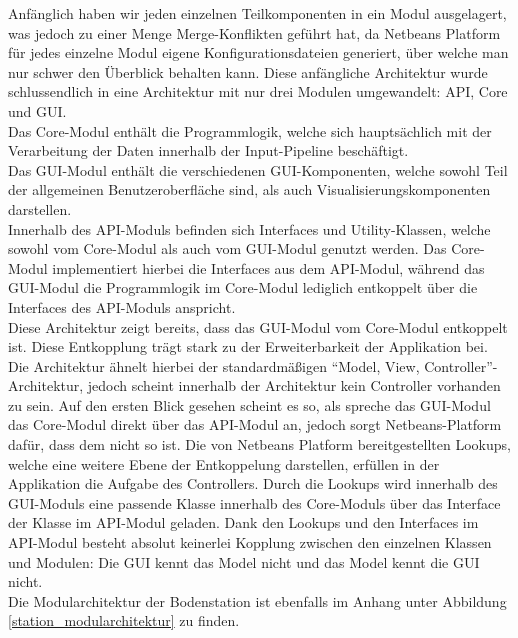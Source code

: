 Anfänglich haben wir jeden einzelnen Teilkomponenten in ein Modul ausgelagert, was jedoch zu einer Menge Merge-Konflikten geführt hat, da Netbeans Platform für jedes einzelne Modul eigene Konfigurationsdateien generiert, über welche man nur schwer den Überblick behalten kann. Diese anfängliche Architektur wurde schlussendlich in eine Architektur mit nur drei Modulen umgewandelt: API, Core und GUI. \\
Das Core-Modul enthält die Programmlogik, welche sich hauptsächlich mit der Verarbeitung der Daten innerhalb der Input-Pipeline beschäftigt. \\
Das GUI-Modul enthält die verschiedenen GUI-Komponenten, welche sowohl Teil der allgemeinen Benutzeroberfläche sind, als auch Visualisierungskomponenten darstellen. \\
Innerhalb des API-Moduls befinden sich Interfaces und Utility-Klassen, welche sowohl vom Core-Modul als auch vom GUI-Modul genutzt werden. Das Core-Modul implementiert hierbei die Interfaces aus dem API-Modul, während das GUI-Modul die Programmlogik im Core-Modul lediglich entkoppelt über die Interfaces des API-Moduls anspricht. \\
Diese Architektur zeigt bereits, dass das GUI-Modul vom Core-Modul entkoppelt ist. Diese Entkopplung trägt stark zu der Erweiterbarkeit der Applikation bei. Die Architektur ähnelt hierbei der standardmäßigen ``Model, View, Controller''-Architektur, jedoch scheint innerhalb der Architektur kein Controller vorhanden zu sein. Auf den ersten Blick gesehen scheint es so, als spreche das GUI-Modul das Core-Modul direkt über das API-Modul an, jedoch sorgt Netbeans-Platform dafür, dass dem nicht so ist. Die von Netbeans Platform bereitgestellten Lookups, welche eine weitere Ebene der Entkoppelung darstellen, erfüllen in der Applikation die Aufgabe des Controllers. Durch die Lookups wird innerhalb des GUI-Moduls eine passende Klasse innerhalb des Core-Moduls über das Interface der Klasse im API-Modul geladen. Dank den Lookups und den Interfaces im API-Modul besteht absolut keinerlei Kopplung zwischen den einzelnen Klassen und Modulen: Die GUI kennt das Model nicht und das Model kennt die GUI nicht. \\
Die Modularchitektur der Bodenstation ist ebenfalls im Anhang unter Abbildung \ref{station_modularchitektur} zu finden.

